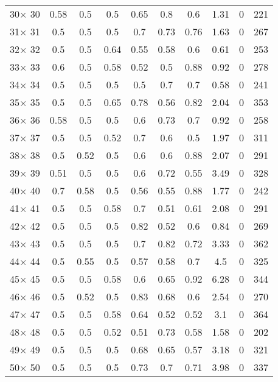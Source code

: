 \documentclass[main.tex]{subfiles}
\begin{document}
\begin{table}
\begin{tabular}{|c|c|c|c|c|c|c|c|c|c|}
30$\times$ 30 &0.58 &0.5 &0.5 &0.65 &0.8 &0.6 &1.31 &0 &221\\
31$\times$ 31 &0.5 &0.5 &0.5 &0.7 &0.73 &0.76 &1.63 &0 &267\\
32$\times$ 32 &0.5 &0.5 &0.64 &0.55 &0.58 &0.6 &0.61 &0 &253\\
33$\times$ 33 &0.6 &0.5 &0.58 &0.52 &0.5 &0.88 &0.92 &0 &278\\
34$\times$ 34 &0.5 &0.5 &0.5 &0.5 &0.7 &0.7 &0.58 &0 &241\\
35$\times$ 35 &0.5 &0.5 &0.65 &0.78 &0.56 &0.82 &2.04 &0 &353\\
36$\times$ 36 &0.58 &0.5 &0.5 &0.6 &0.73 &0.7 &0.92 &0 &258\\
37$\times$ 37 &0.5 &0.5 &0.52 &0.7 &0.6 &0.5 &1.97 &0 &311\\
38$\times$ 38 &0.5 &0.52 &0.5 &0.6 &0.6 &0.88 &2.07 &0 &291\\
39$\times$ 39 &0.51 &0.5 &0.5 &0.6 &0.72 &0.55 &3.49 &0 &328\\
40$\times$ 40 &0.7 &0.58 &0.5 &0.56 &0.55 &0.88 &1.77 &0 &242\\
41$\times$ 41 &0.5 &0.5 &0.58 &0.7 &0.51 &0.61 &2.08 &0 &291\\
42$\times$ 42 &0.5 &0.5 &0.5 &0.82 &0.52 &0.6 &0.84 &0 &269\\
43$\times$ 43 &0.5 &0.5 &0.5 &0.7 &0.82 &0.72 &3.33 &0 &362\\
44$\times$ 44 &0.5 &0.55 &0.5 &0.57 &0.58 &0.7 &4.5 &0 &325\\
45$\times$ 45 &0.5 &0.5 &0.58 &0.6 &0.65 &0.92 &6.28 &0 &344\\
46$\times$ 46 &0.5 &0.52 &0.5 &0.83 &0.68 &0.6 &2.54 &0 &270\\
47$\times$ 47 &0.5 &0.5 &0.58 &0.64 &0.52 &0.52 &3.1 &0 &364\\
48$\times$ 48 &0.5 &0.5 &0.52 &0.51 &0.73 &0.58 &1.58 &0 &202\\
49$\times$ 49 &0.5 &0.5 &0.5 &0.68 &0.65 &0.57 &3.18 &0 &321\\
50$\times$ 50 &0.5 &0.5 &0.5 &0.73 &0.7 &0.71 &3.98 &0 &337\\
    \hline
    \end{tabular}
\end{table}
\end{document}

